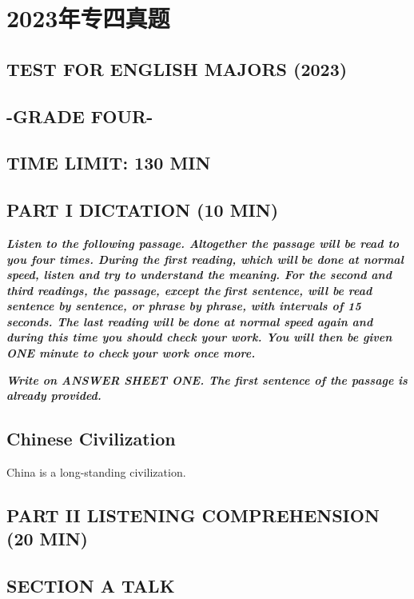 \documentclass[UTF8,11pt]{ctexart}
\begin{document}
\section*{2023年专四真题}
\subsection*{\textbf{TEST} \textbf{FOR} \textbf{ENGLISH} \textbf{MAJORS (2023)}}


\subsection*{\textbf{-GRADE FOUR-}}


\subsection*{\textbf{TIME LIMIT: 130 MIN}}


\subsection*{\textbf{PART I DICTATION (10 MIN})}


\textbf{\textit{Listen to the following passage. Altogether the passage will be read to you four times. During the first reading, which will}} \textbf{\textit{be done at normal speed, listen and try to understand the meaning. For the second and third readings, the passage, except the}} \textbf{\textit{first sentence, will be read sentence by sentence, or phrase by phrase, with intervals of 15 seconds. The last reading will be}} \textbf{\textit{done at normal speed again and during this time you should check your work. You will then be given ONE minute to check}} \textbf{\textit{your work once more.}}


\textbf{\textit{Write on ANSWER SHEET ONE. The first sentence of the passage is already provided.}}


\subsection*{\textbf{Chinese Civilization}}


China is a long-standing civilization.


\subsection*{\textbf{PART II LISTENING COMPREHENSION (20 MIN})}


\subsection*{\textbf{SECTION A TALK}}
\end{document}
